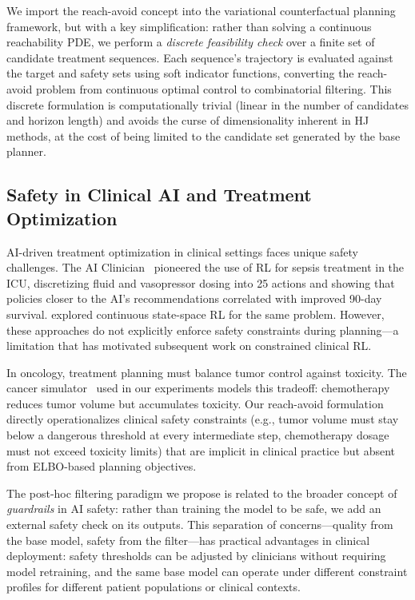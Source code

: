 \documentclass{article}
\begin{document}
We import the reach-avoid concept into the variational counterfactual planning framework, but with a key simplification: rather than solving a continuous reachability PDE, we perform a \emph{discrete feasibility check} over a finite set of candidate treatment sequences. Each sequence's trajectory is evaluated against the target and safety sets using soft indicator functions, converting the reach-avoid problem from continuous optimal control to combinatorial filtering. This discrete formulation is computationally trivial (linear in the number of candidates and horizon length) and avoids the curse of dimensionality inherent in HJ methods, at the cost of being limited to the candidate set generated by the base planner.

\subsection{Safety in Clinical AI and Treatment Optimization}

AI-driven treatment optimization in clinical settings faces unique safety challenges. The AI Clinician~\citep{komorowski2018ai} pioneered the use of RL for sepsis treatment in the ICU, discretizing fluid and vasopressor dosing into 25 actions and showing that policies closer to the AI's recommendations correlated with improved 90-day survival. \citet{raghu2017deep} explored continuous state-space RL for the same problem. However, these approaches do not explicitly enforce safety constraints during planning---a limitation that has motivated subsequent work on constrained clinical RL.

In oncology, treatment planning must balance tumor control against toxicity. The cancer simulator~\citep{geng2017cancer, bica2020cancer} used in our experiments models this tradeoff: chemotherapy reduces tumor volume but accumulates toxicity. Our reach-avoid formulation directly operationalizes clinical safety constraints (e.g., tumor volume must stay below a dangerous threshold at every intermediate step, chemotherapy dosage must not exceed toxicity limits) that are implicit in clinical practice but absent from ELBO-based planning objectives.

The post-hoc filtering paradigm we propose is related to the broader concept of \emph{guardrails} in AI safety: rather than training the model to be safe, we add an external safety check on its outputs. This separation of concerns---quality from the base model, safety from the filter---has practical advantages in clinical deployment: safety thresholds can be adjusted by clinicians without requiring model retraining, and the same base model can operate under different constraint profiles for different patient populations or clinical contexts.
\end{document}

